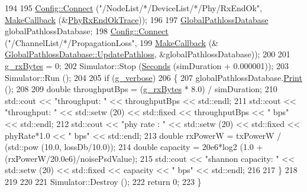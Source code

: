 \begin{DoxyCode}
194 
195   \hyperlink{group__config_ga4014f151241cd0939b6cb64409605736}{Config::Connect} (\textcolor{stringliteral}{"/NodeList/*/DeviceList/*/Phy/RxEndOk"}, 
      \hyperlink{group__makecallbackmemptr_ga9376283685aa99d204048d6a4b7610a4}{MakeCallback} (&\hyperlink{adhoc-aloha-ideal-phy-matrix-propagation-loss-model_8cc_abe11a97645f01a1213944fb2cbabeb1a}{PhyRxEndOkTrace}));
196 
197   \hyperlink{classGlobalPathlossDatabase}{GlobalPathlossDatabase} globalPathlossDatabase;
198   \hyperlink{group__config_ga4014f151241cd0939b6cb64409605736}{Config::Connect} (\textcolor{stringliteral}{"/ChannelList/*/PropagationLoss"},
199                    \hyperlink{group__makecallbackmemptr_ga9376283685aa99d204048d6a4b7610a4}{MakeCallback} (&
      \hyperlink{classGlobalPathlossDatabase_abbd4ad9e4abc663e21fab239a89e934f}{GlobalPathlossDatabase::UpdatePathloss}, &globalPathlossDatabase));
200 
201   \hyperlink{adhoc-aloha-ideal-phy-matrix-propagation-loss-model_8cc_af09b60ca0cfec21bd5d0aff8f44eb19c}{g\_rxBytes} = 0;
202   Simulator::Stop (\hyperlink{group__timecivil_ga33c34b816f8ff6628e33d5c8e9713b9e}{Seconds} (simDuration + 0.000001));
203   Simulator::Run ();
204 
205   \textcolor{keywordflow}{if} (\hyperlink{adhoc-aloha-ideal-phy-matrix-propagation-loss-model_8cc_a817b47f52eeb5f98e32ce7d19a86aa7e}{g\_verbose})
206     \{
207       globalPathlossDatabase.\hyperlink{classGlobalPathlossDatabase_acab59595a8e9daca4de05c5bee4c4d38}{Print} ();
208 
209       \textcolor{keywordtype}{double} throughputBps = (\hyperlink{adhoc-aloha-ideal-phy-matrix-propagation-loss-model_8cc_af09b60ca0cfec21bd5d0aff8f44eb19c}{g\_rxBytes} * 8.0) / simDuration;
210       std::cout << \textcolor{stringliteral}{"throughput:       "} << throughputBps << std::endl;
211       std::cout << \textcolor{stringliteral}{"throughput:       "} << std::setw (20) << std::fixed << throughputBps << \textcolor{stringliteral}{" bps"} << 
      std::endl;
212       std::cout << \textcolor{stringliteral}{"phy rate  :       "}   << std::setw (20) << std::fixed << phyRate*1.0 << \textcolor{stringliteral}{" bps"} << 
      std::endl; 
213       \textcolor{keywordtype}{double} rxPowerW = txPowerW / (std::pow (10.0, lossDb/10.0));
214       \textcolor{keywordtype}{double} capacity = 20e6*log2 (1.0 + (rxPowerW/20.0e6)/noisePsdValue);
215       std::cout << \textcolor{stringliteral}{"shannon capacity: "}   << std::setw (20) << std::fixed << capacity <<  \textcolor{stringliteral}{" bps"} << 
      std::endl; 
216 
217     \}
218 
219 
220 
221   Simulator::Destroy ();
222   \textcolor{keywordflow}{return} 0;
223 \}
\end{DoxyCode}


